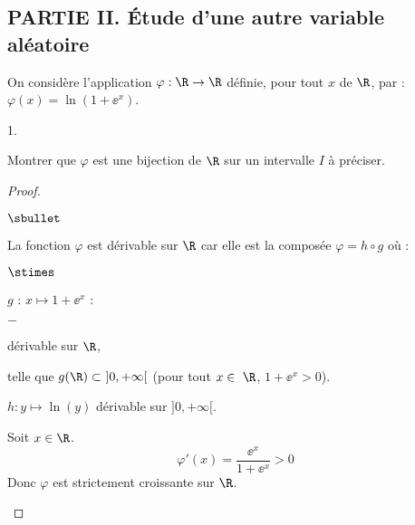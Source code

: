 \subsection*{PARTIE II. Étude d'une autre variable aléatoire}

\noindent
On considère l'application $\varphi: \R\rightarrow\R$ définie, pour
tout $x$ de $\R$, par : $\varphi(x) = \ln(1+\ee^x)$.
\begin{noliste}{1.}
  \setlength{\itemsep}{2mm}%
  \setcounter{enumi}{4}
\item Montrer que $\varphi$ est une bijection de $\R$ sur un 
  intervalle $I$ à préciser.

\begin{proof}~
 \begin{noliste}{$\sbullet$}
 \item La fonction $\varphi$ est dérivable sur $\R$ car elle est la
   composée $\varphi = h\circ g$ où :
  \begin{noliste}{$\stimes$}
  \item $g$ : $x\mapsto 1+\ee^x$ :
      \begin{noliste}{$-$}
      \item dérivable sur $\R$,
      \item telle que $g(\R)\subset \ ]0,+\infty[$ (pour tout $x\in \
        \R$, $1+\ee^x>0$).
      \end{noliste}

    \item $h:y\mapsto \ln(y)$ dérivable sur 
    $]0,+\infty[$.
  \end{noliste}
  
  
  \item Soit $x\in\R$.
  \[
   \varphi'(x) = \dfrac{\ee^x}{1+\ee^x} >0
  \]
  Donc $\varphi$ est strictement croissante sur $\R$.
  
   

\end{noliste}
\end{proof}
\end{noliste}
